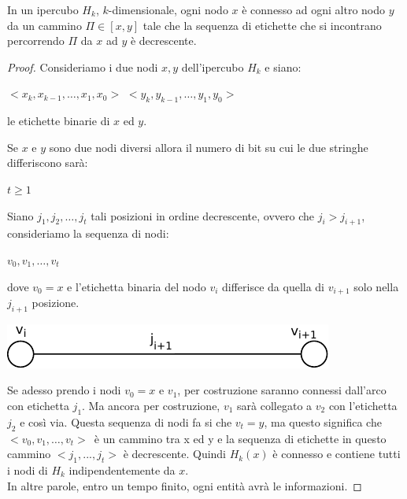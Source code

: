 \begin{prop}
    In un ipercubo $H_k$, $k$-dimensionale, ogni nodo $x$ è connesso
    ad ogni altro nodo $y$ da un cammino $\Pi \in [x,y]$ tale che la sequenza di
    etichette che si incontrano percorrendo $\Pi$ da $x$ ad $y$ è decrescente.
\end{prop}
\begin{proof}
    Consideriamo i due nodi $x,y$ dell'ipercubo $H_k$ e siano:
    \begin{center}
        $<x_k, x_{k-1}, \ldots, x_1,x_0>$ $<y_k, y_{k-1}, \ldots, y_1,y_0>$
    \end{center}
    le etichette binarie di $x$ ed $y$.

    Se $x$ e $y$ sono due nodi diversi allora il numero di bit su cui le due
    stringhe differiscono sarà:
    \begin{center}
        $t \geq 1$
    \end{center}

    Siano $j_1, j_2, \ldots, j_t$ tali posizioni in ordine decrescente, ovvero
    che $j_i > j_{i+1}$, consideriamo la sequenza di nodi:
    \begin{center}
        $v_0, v_1, \ldots ,v_t$
    \end{center}
    dove $v_0 = x$ e l'etichetta binaria del nodo $v_i$ differisce da quella di
    $v_{i+1}$ solo nella $j_{i+1}$ posizione.
    \begin{center}
        \includegraphics[scale=1]{capitoli/broadcast/imgs/n_12}
    \end{center}

    Se adesso prendo i nodi $v_0 = x $ e $v_1$, per costruzione saranno connessi
    dall'arco con etichetta $j_1$. Ma ancora per costruzione, $v_1$ sarà
    collegato a $v_2$ con l'etichetta $j_2$ e così via. Questa sequenza di nodi
    fa si che $v_t =  y$, ma questo significa che $<v_0, v_1, \ldots ,v_t>$\ è
    un cammino tra x ed y e la sequenza di etichette in questo cammino $<j_1,
        ..., j_t>$ è decrescente. Quindi $H_k(x)$ è connesso e contiene tutti i nodi
    di $H_k$ indipendentemente da $x$.\\
    In altre parole, entro un tempo finito, ogni entità avrà le informazioni.

\end{proof}

